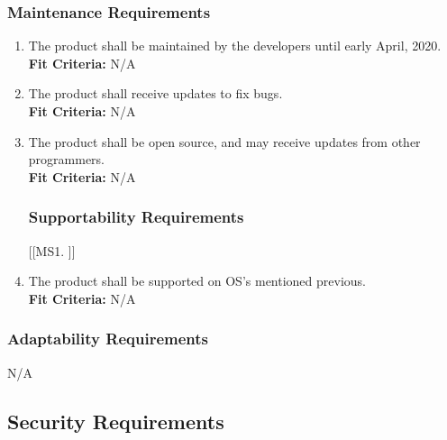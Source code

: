 \documentclass[12pt, titlepage]{article}
\begin{document}
\subsubsection{Maintenance Requirements}
\begin{enumerate}[{MS}1. ]
    \item The product shall be maintained by the developers until early April, 2020.\\
    \textbf{Fit Criteria:} N/A
    \item The product shall receive updates to fix bugs.\\
    \textbf{Fit Criteria:} N/A
    \item The product shall be open source, and may receive updates from other programmers.\\
    \textbf{Fit Criteria:} N/A

\subsubsection{Supportability Requirements}
[{[{MS}1. ]}]
    \item The product shall be supported on OS's mentioned previous.\\
    \textbf{Fit Criteria:} N/A
\end{enumerate}

\subsubsection{Adaptability Requirements}
N/A



\subsection{Security Requirements}
\end{document}
